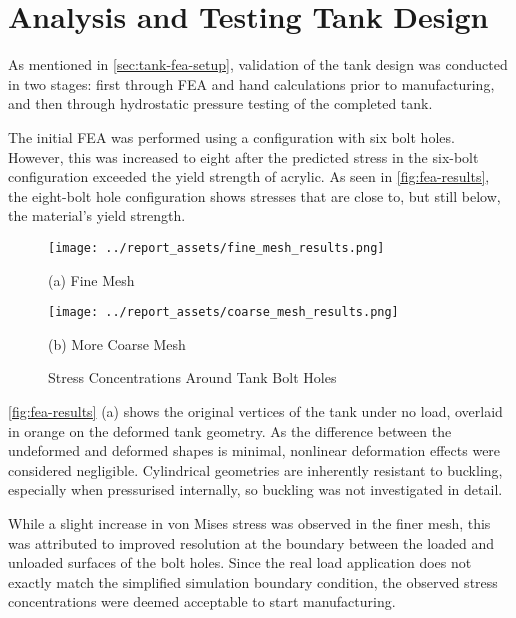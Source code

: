 \section{Analysis and Testing Tank Design}\label{sec:pressure-testing}
As mentioned in \autoref{sec:tank-fea-setup}, validation of the tank design was conducted in two stages: first through FEA and hand calculations prior to manufacturing, and then through hydrostatic pressure testing of the completed tank.

The initial FEA was performed using a configuration with six bolt holes. However, this was increased to eight after the predicted stress in the six-bolt configuration exceeded the yield strength of acrylic. As seen in \autoref{fig:fea-results}, the eight-bolt hole configuration shows stresses that are close to, but still below, the material's yield strength.
\begin{figure}[htbp]
    \centering

    \begin{minipage}{0.45\textwidth}
        \centering
        \texttt{[image: ../report\_assets/fine\_mesh\_results.png]}
        \caption*{(a) Fine Mesh}
    \end{minipage}    
    \hfill
    \begin{minipage}{0.45\textwidth}
        \centering
        \texttt{[image: ../report\_assets/coarse\_mesh\_results.png]}
        \caption*{(b) More Coarse Mesh}
    \end{minipage}    
    \caption{Stress Concentrations Around Tank Bolt Holes}\label{fig:fea-results}

\end{figure}  
\autoref{fig:fea-results} (a) shows the original vertices of the tank under no load, overlaid in orange on the deformed tank geometry. As the difference between the undeformed and deformed shapes is minimal, nonlinear deformation effects were considered negligible. Cylindrical geometries are inherently resistant to buckling, especially when pressurised internally, so buckling was not investigated in detail.

While a slight increase in von Mises stress was observed in the finer mesh, this was attributed to improved resolution at the boundary between the loaded and unloaded surfaces of the bolt holes. Since the real load application does not exactly match the simplified simulation boundary condition, the observed stress concentrations were deemed acceptable to start manufacturing.

